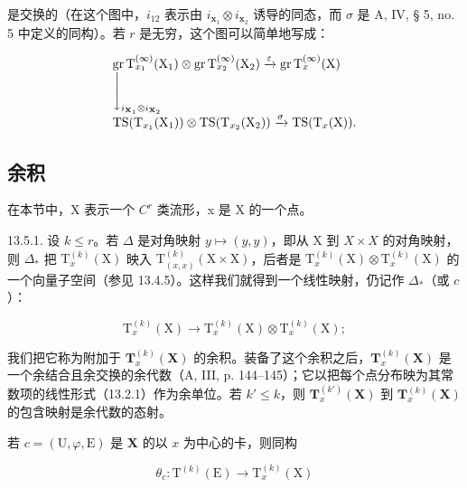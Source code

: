 是交换的（在这个图中，\(i_{12}\) 表示由 \(i_{\mathbf{x}_1} \otimes i_{\mathbf{x}_2}\) 诱导的同态，而 \(\sigma\) 是 A, IV, § 5, no. 5 中定义的同构）。若 \(r\) 是无穷，这个图可以简单地写成：

\[
\begin{array}{l} \operatorname{gr} \mathrm{T} _ {x _ {1}} ^ {(\infty)} (\mathrm{X} _ {1}) \otimes \operatorname{gr} \mathrm{T} _ {x _ {2}} ^ {(\infty)} (\mathrm{X} _ {2}) \xrightarrow {\varepsilon} \operatorname{gr} \mathrm{T} _ {x} ^ {(\infty)} (\mathrm{X}) \\ \Biggl \downarrow_ {i _ {\mathbf {X} _ {1}} \otimes i _ {\mathbf {X} _ {2}}} \\ \operatorname{TS} (\mathrm{T} _ {x _ {1}} (\mathrm{X} _ {1})) \otimes \operatorname{TS} (\mathrm{T} _ {x _ {2}} (\mathrm{X} _ {2})) \xrightarrow {\sigma} \operatorname{TS} (\mathrm{T} _ {x} (\mathrm{X})). \end{array}
\]

\subsection{余积}

在本节中，X 表示一个 \(C^{r}\) 类流形，x 是 X 的一个点。

13.5.1. 设 \(k \leqslant r\)。若 \(\Delta\) 是对角映射 \(y \mapsto (y, y)\)，即从 X 到 \(X \times X\) 的对角映射，则 \(\Delta_*\) 把 \(\mathrm{T}_x^{(k)}(\mathrm{X})\) 映入 \(\mathrm{T}_{(x,x)}^{(k)}(\mathrm{X} \times \mathrm{X})\)，后者是 \(\mathrm{T}_{x}^{(k)}(\mathrm{X})\otimes\mathrm{T}_{x}^{(k)}(\mathrm{X})\) 的一个向量子空间（参见 13.4.5）。这样我们就得到一个线性映射，仍记作 \(\Delta_{*}\)（或 \(c\)）：

\[
\mathrm{T} _ {x} ^ {(k)} (\mathrm{X}) \rightarrow \mathrm{T} _ {x} ^ {(k)} (\mathrm{X}) \otimes \mathrm{T} _ {x} ^ {(k)} (\mathrm{X});
\]

我们把它称为附加于 \(\mathbf{T}_{x}^{(k)}(\mathbf{X})\) 的余积。装备了这个余积之后，\(\mathbf{T}_{x}^{(k)}(\mathbf{X})\) 是一个余结合且余交换的余代数（A, III, p. 144–145）；它以把每个点分布映为其常数项的线性形式（13.2.1）作为余单位。若 \(k' \leqslant k\)，则 \(\mathbf{T}_{x}^{(k')}(\mathbf{X})\) 到 \(\mathbf{T}_{x}^{(k)}(\mathbf{X})\) 的包含映射是余代数的态射。

若 \(c = (\mathrm{U},\varphi ,\mathrm{E})\) 是 \(\mathbf{X}\) 的以 \(x\) 为中心的卡，则同构

\[
\theta_ {c} \colon \mathrm{T} ^ {(k)} (\mathrm{E}) \rightarrow \mathrm{T} _ {x} ^ {(k)} (\mathrm{X})
\]

